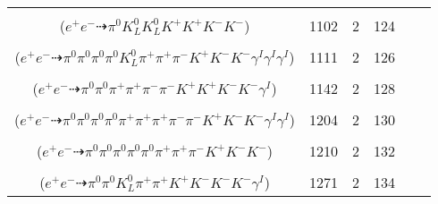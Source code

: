\documentclass[landscape]{article}
\newcounter{rownumbers}
\newcommand\rn{\stepcounter{rownumbers}\arabic{rownumbers}}
\newcommand{\EOL}{\\} %
\newcommand{\topoTags}[1]{#1} %
\begin{document}
\begin{longtable}{clcccc}
\rn & \makecell[l]{ $ 
e^{+} e^{-} \rightarrow K^{0} \bar{K}^{0} K^{+} K^{-} K^{-} K^{*+} ,
K^{0} \rightarrow K_{L}^{0} ,
\bar{K}^{0} \rightarrow K_{L}^{0} ,
K^{*+} \rightarrow \pi^{0} K^{+} 
$ \\ ($
e^{+} e^{-} \dashrightarrow \pi^{0} K_{L}^{0} K_{L}^{0} K^{+} K^{+} K^{-} K^{-} 
$) } & \topoTags{1102 & }2 & 124 \EOL

\rn & \makecell[l]{ $ 
e^{+} e^{-} \rightarrow \pi^{0} \pi^{0} \pi^{-} \rho^{+} K^{*+} K^{*-} \phi \gamma^{I} \gamma^{I} \gamma^{I} ,
\rho^{+} \rightarrow \pi^{0} \pi^{+} ,
K^{*+} \rightarrow \pi^{+} K^{0} ,
K^{*-} \rightarrow \pi^{0} K^{-} ,
\phi \rightarrow K^{+} K^{-} ,
K^{0} \rightarrow K_{L}^{0} 
$ \\ ($
e^{+} e^{-} \dashrightarrow \pi^{0} \pi^{0} \pi^{0} \pi^{0} K_{L}^{0} \pi^{+} \pi^{+} \pi^{-} K^{+} K^{-} K^{-} \gamma^{I} \gamma^{I} \gamma^{I} 
$) } & \topoTags{1111 & }2 & 126 \EOL

\rn & \makecell[l]{ $ 
e^{+} e^{-} \rightarrow \pi^{0} \pi^{+} \pi^{-} \pi^{-} \rho^{+} K^{+} K^{+} K^{-} K^{-} \gamma^{I} ,
\rho^{+} \rightarrow \pi^{0} \pi^{+} 
$ \\ ($
e^{+} e^{-} \dashrightarrow \pi^{0} \pi^{0} \pi^{+} \pi^{+} \pi^{-} \pi^{-} K^{+} K^{+} K^{-} K^{-} \gamma^{I} 
$) } & \topoTags{1142 & }2 & 128 \EOL

\rn & \makecell[l]{ $ 
e^{+} e^{-} \rightarrow \pi^{0} \pi^{0} \rho^{0} \rho^{0} \pi^{+} K^{0} K^{+} K^{-} K^{-} \gamma^{I} \gamma^{I} ,
\rho^{0} \rightarrow \pi^{+} \pi^{-} ,
\rho^{0} \rightarrow \pi^{+} \pi^{-} ,
K^{0} \rightarrow K_{S}^{0} ,
K_{S}^{0} \rightarrow \pi^{0} \pi^{0} 
$ \\ ($
e^{+} e^{-} \dashrightarrow \pi^{0} \pi^{0} \pi^{0} \pi^{0} \pi^{+} \pi^{+} \pi^{+} \pi^{-} \pi^{-} K^{+} K^{-} K^{-} \gamma^{I} \gamma^{I} 
$) } & \topoTags{1204 & }2 & 130 \EOL

\rn & \makecell[l]{ $ 
e^{+} e^{-} \rightarrow \pi^{0} \pi^{0} \pi^{+} \omega K^{0} K^{+} K^{-} K^{-} ,
\omega \rightarrow \pi^{0} \pi^{+} \pi^{-} ,
K^{0} \rightarrow K_{S}^{0} ,
K_{S}^{0} \rightarrow \pi^{0} \pi^{0} 
$ \\ ($
e^{+} e^{-} \dashrightarrow \pi^{0} \pi^{0} \pi^{0} \pi^{0} \pi^{0} \pi^{+} \pi^{+} \pi^{-} K^{+} K^{-} K^{-} 
$) } & \topoTags{1210 & }2 & 132 \EOL

\rn & \makecell[l]{ $ 
e^{+} e^{-} \rightarrow \pi^{+} K^{0} K^{0} \bar{K}^{*} K^{-} \phi \gamma^{I} ,
K^{0} \rightarrow K_{L}^{0} ,
K^{0} \rightarrow K_{S}^{0} ,
\bar{K}^{*} \rightarrow \pi^{+} K^{-} ,
\phi \rightarrow K^{+} K^{-} ,
K_{S}^{0} \rightarrow \pi^{0} \pi^{0} 
$ \\ ($
e^{+} e^{-} \dashrightarrow \pi^{0} \pi^{0} K_{L}^{0} \pi^{+} \pi^{+} K^{+} K^{-} K^{-} K^{-} \gamma^{I} 
$) } & \topoTags{1271 & }2 & 134 \EOL


\end{longtable}
\end{document}

